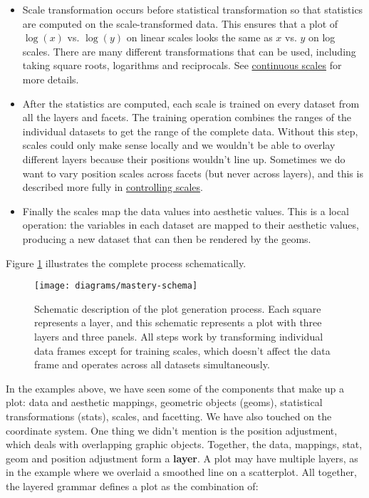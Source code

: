 \begin{itemize}
\item
  Scale transformation occurs before statistical transformation so that
  statistics are computed on the scale-transformed data. This ensures
  that a plot of \(\log(x)\) vs. \(\log(y)\) on linear scales looks the
  same as \(x\) vs. \(y\) on log scales. There are many different
  transformations that can be used, including taking square roots,
  logarithms and reciprocals. See
  \hyperref[sub:scale-position]{continuous scales} for more details.
\item
  After the statistics are computed, each scale is trained on every
  dataset from all the layers and facets. The training operation
  combines the ranges of the individual datasets to get the range of the
  complete data. Without this step, scales could only make sense locally
  and we wouldn't be able to overlay different layers because their
  positions wouldn't line up. Sometimes we do want to vary position
  scales across facets (but never across layers), and this is described
  more fully in \hyperref[sub:controlling-scales]{controlling scales}.
\item
  Finally the scales map the data values into aesthetic values. This is
  a local operation: the variables in each dataset are mapped to their
  aesthetic values, producing a new dataset that can then be rendered by
  the geoms.
\end{itemize}

Figure \ref{fig:schematic} illustrates the complete process
schematically.

\begin{figure}[htbp]
  \centering
  \texttt{[image: diagrams/mastery-schema]}
  \caption{Schematic description of the plot generation process. Each square represents a layer, and this schematic represents a plot with three layers and three panels. All steps work by transforming individual data frames except for training scales, which doesn't affect the data frame and operates across all datasets simultaneously.}
  \label{fig:schematic}
\end{figure}


In the examples above, we have seen some of the components that make up
a plot: data and aesthetic mappings, geometric objects (geoms),
statistical transformations (stats), scales, and facetting. We have also
touched on the coordinate system. One thing we didn't mention is the
position adjustment, which deals with overlapping graphic objects.
Together, the data, mappings, stat, geom and position adjustment form a
\textbf{layer}. A plot may have multiple layers, as in the example where
we overlaid a smoothed line on a scatterplot. All together, the layered
grammar defines a plot as the combination of: 

